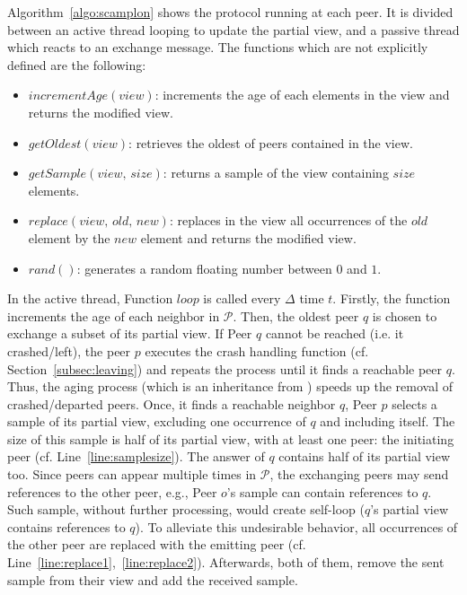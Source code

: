 Algorithm~\ref{algo:scamplon} shows the \SPRAY protocol running at each
peer. It is divided between an active thread looping to update the partial
view, and a passive thread which reacts to an exchange message. The functions
which are not explicitly defined are the following:
\begin{itemize}
\item $incrementAge(view)$: increments the age of each elements in the view
  and returns the modified view.
\item $getOldest(view)$: retrieves the oldest of peers contained in the view.
\item $getSample(view, \, size)$: returns a sample of the view containing
  $size$ elements.
\item $replace(view,\,old,\,new)$: replaces in the view all occurrences of
  the $old$ element by the $new$ element and returns the modified view.
\item $rand()$: generates a random floating number between $0$ and $1$.
\end{itemize}

In the active thread, Function $loop$ is called every $\Delta$ time
$t$. Firstly, the function increments the age of each neighbor in
$\mathcal{P}$. Then, the oldest peer $q$ is chosen to exchange a subset of its
partial view. If Peer $q$ cannot be reached (i.e. it crashed/left), the peer
$p$ executes the crash handling function (cf. Section~\ref{subsec:leaving}) and
repeats the process until it finds a reachable peer $q$. Thus, the aging
process (which is an inheritance from \CYCLON) speeds up the removal of
crashed/departed peers. Once, it finds a reachable neighbor $q$, Peer $p$
selects a sample of its partial view, excluding one occurrence of $q$ and
including itself. The size of this sample is half of its partial view, with at
least one peer: the initiating peer (cf. Line~\ref{line:samplesize}). The
answer of $q$ contains half of its partial view too. Since peers can appear
multiple times in $\mathcal{P}$, the exchanging peers may send references to
the other peer, e.g., Peer $o$'s sample can contain references to $q$. Such
sample, without further processing, would create self-loop ($q$'s partial view
contains references to $q$). To alleviate this undesirable behavior, all
occurrences of the other peer are replaced with the emitting peer
(cf. Line~\ref{line:replace1},~\ref{line:replace2}).  Afterwards, both of them,
remove the sent sample from their view and add the received sample.

